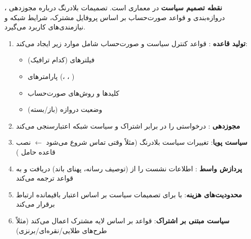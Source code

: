 

\CNchained{}

 \textbf{نقطه تصمیم سیاست} در معماری  است. تصمیمات بلادرنگ درباره مجوزدهی ، دروازه‌بندی و قواعد صورت‌حساب بر اساس پروفایل مشترک، شرایط شبکه و نیازمندی‌های کاربرد می‌گیرد.


\begin{enumerate}
\def\labelenumi{\arabic{enumi}.}
\tightlist
\item
  \textbf{تولید قاعده }: قواعد کنترل سیاست و صورت‌حساب شامل موارد زیر ایجاد می‌کند:

  \begin{itemize}
  \tightlist
  \item
    فیلترهای  (کدام ترافیک)
  \item
    پارامترهای  (، ، )
  \item
    کلیدها و روش‌های صورت‌حساب
  \item
    وضعیت دروازه (باز/\allowbreak{}بسته)
  \end{itemize}
\item
  \textbf{مجوزدهی }:  درخواستی را در برابر اشتراک و سیاست شبکه اعتبارسنجی می‌کند
\item
  \textbf{سیاست پویا}: تغییرات سیاست بلادرنگ (مثلاً وقتی تماس  شروع می‌شود \ensuremath{\leftarrow} نصب قاعده حامل )
\item
  \textbf{پردازش واسط }: اطلاعات نشست را از  (توصیف رسانه، پهنای باند) دریافت و به قواعد  ترجمه می‌کند
\item
  \textbf{محدودیت‌های هزینه}: با  برای تصمیمات سیاست بر اساس اعتبار باقیمانده ارتباط برقرار می‌کند
\item
  \textbf{سیاست مبتنی بر اشتراک}: قواعد بر اساس لایه مشترک اعمال می‌کند (مثلاً طرح‌های طلایی/\allowbreak{}نقره‌ای/\allowbreak{}برنزی)
\end{enumerate}



